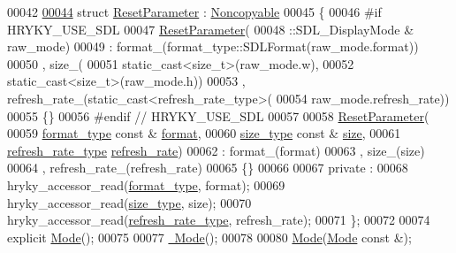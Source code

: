 \begin{DoxyCode}
00042 
\hypertarget{display__mode_8h_source_l00044}{}\hyperlink{structhryky_1_1display_1_1_mode_1_1_reset_parameter}{00044}     \textcolor{keyword}{struct }\hyperlink{structhryky_1_1display_1_1_mode_1_1_reset_parameter}{ResetParameter} : \hyperlink{classhryky_1_1_noncopyable}{Noncopyable}
00045     \{
00046 \textcolor{preprocessor}{#if HRYKY\_USE\_SDL}
00047 \textcolor{preprocessor}{}        \hyperlink{structhryky_1_1display_1_1_mode_1_1_reset_parameter}{ResetParameter}(
00048             ::SDL\_DisplayMode & raw\_mode)
00049             : format\_(format\_type::SDLFormat(raw\_mode.format))
00050               , size\_(
00051                   static\_cast<size\_t>(raw\_mode.w),
00052                   static\_cast<size\_t>(raw\_mode.h))
00053               , refresh\_rate\_(static\_cast<refresh\_rate\_type>(
00054                   raw\_mode.refresh\_rate))
00055         \{\}
00056 \textcolor{preprocessor}{#endif // HRYKY\_USE\_SDL}
00057 \textcolor{preprocessor}{}        
00058         \hyperlink{structhryky_1_1display_1_1_mode_1_1_reset_parameter}{ResetParameter}(
00059             \hyperlink{classhryky_1_1pixel_1_1_format}{format_type} \textcolor{keyword}{const} & \hyperlink{classhryky_1_1display_1_1_mode_a17b84e905579d33e25f8946eb67ca2a9}{format},
00060             \hyperlink{classhryky_1_1geometry_1_1coord_1_1_cartesian2_d}{size_type} \textcolor{keyword}{const} & \hyperlink{classhryky_1_1display_1_1_mode_aebf3abe6a97f73877f40dfb3ebb7053f}{size},
00061             \hyperlink{namespacehryky_1_1display_ac8bdbe1db3aaf491d26848562e9fa29c}{refresh_rate_type} \hyperlink{classhryky_1_1display_1_1_mode_a630c4afc7a681e0b50b278987a8f80b4}{refresh_rate})
00062             : format\_(format)
00063               , size\_(size)
00064               , refresh\_rate\_(refresh\_rate)
00065         \{\}
00066 
00067     \textcolor{keyword}{private} :
00068         hryky\_accessor\_read(\hyperlink{classhryky_1_1pixel_1_1_format}{format_type},        format);
00069         hryky\_accessor\_read(\hyperlink{classhryky_1_1geometry_1_1coord_1_1_cartesian2_d}{size_type},          size);
00070         hryky\_accessor\_read(\hyperlink{namespacehryky_1_1display_ac8bdbe1db3aaf491d26848562e9fa29c}{refresh_rate_type},  refresh\_rate);
00071     \};
00072 
00074     \textcolor{keyword}{explicit} \hyperlink{classhryky_1_1display_1_1_mode_a0ea5d1bb08e8ea3e8c3b0f29d8c3d038}{Mode}();
00075 
00077     \hyperlink{classhryky_1_1display_1_1_mode_a7d4d028e408e4f498865ba7c749f9d7b}{~Mode}();
00078 
00080     \hyperlink{classhryky_1_1display_1_1_mode_a0ea5d1bb08e8ea3e8c3b0f29d8c3d038}{Mode}(\hyperlink{classhryky_1_1display_1_1_mode}{Mode} \textcolor{keyword}{const} &);

\end{DoxyCode}
